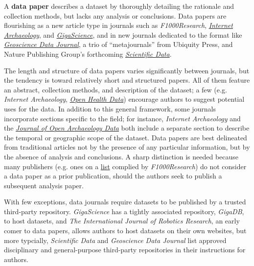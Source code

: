 \documentclass[10pt,twocolumn]{article}
\begin{document}
A \textbf{data paper} describes a dataset by thoroughly detailing the rationale and collection methods, but lacks any analysis or conclusions.\cite{newman_data_2009}
Data papers are flourishing as a new article type in journals such as \emph{F1000Research}, \href{http://www.internetarchaeology.org/}{\emph{Internet Archaeology}}, and \href{http://www.gigasciencejournal.com/}{\emph{GigaScience}}\cite{gigascience}, and in new journals dedicated to the format like \href{http://onlinelibrary.wiley.com/journal/10.1002/%28ISSN%292049-6060}{\emph{Geoscience Data Journal}}\cite{geoscience_data_journal}, a trio of ``metajournals'' from Ubiquity Press, and Nature Publishing Group's forthcoming \href{http://www.nature.com/scientificdata/}{\emph{Scientific Data}}.

The length and structure of data papers varies significantly between journals, but the tendency is toward relatively short and structured papers.
All of them feature an abstract, collection methods, and description of the dataset; a few (e.g. \emph{Internet Archaeology}, \href{http://openhealthdata.metajnl.com/about/submissions#authorGuidelines}{\emph{Open Health Data}}) encourage authors to suggest potential uses for the data.
In addition to this general framework, some journals incorporate sections specific to the field; for instance, \emph{Internet Archaeology} and the \href{http://openarchaeologydata.metajnl.com/}{\emph{Journal of Open Archaeology Data}} both include a separate section to describe the  temporal or geographic scope of the dataset.
Data papers are best delineated from traditional articles not by the presence of any particular information, but by the absence of analysis and conclusions.
A sharp distinction is needed because many publishers (e.g. ones on a \href{https://f1000research.com/data-policies}{list} complied by \emph{F1000Research}) do not consider a data paper as a prior publication, should the authors seek to publish a subsequent analysis paper.

With few exceptions, data journals require datasets to be published by a trusted third-party repository.
\emph{GigaScience} has a tightly associated repository, \emph{GigaDB}, to host datasets, and \emph{The International Journal of Robotics Research}\cite{international_journal_of_robotics_research}, an early comer to data papers\cite{newman_data_2009}, allows authors to host datasets on their own websites, but more typcially, \emph{Scientific Data} and \emph{Geoscience Data Journal} list approved disciplinary and general-purpose third-party repositories in their instructions for authors.
\end{document}
